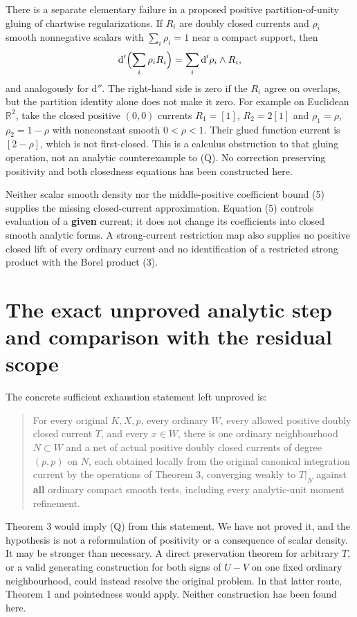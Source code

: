 \documentclass[
  11pt,
]{article}
\begin{document}
There is a separate elementary failure in a proposed positive
partition-of-unity gluing of chartwise regularizations. If \(R_i\) are
doubly closed currents and \(\rho_i\) smooth nonnegative scalars with
\(\sum_i\rho_i=1\) near a compact support, then
\[\mathrm d'\Bigl(\sum_i\rho_iR_i\Bigr)
    =\sum_i\mathrm d'\rho_i\wedge R_i,\] and analogously for
\(\mathrm d''\). The right-hand side is zero if the \(R_i\) agree on
overlaps, but the partition identity alone does not make it zero. For
example on Euclidean \(\mathbb R^2\), take the closed positive \((0,0)\)
currents \(R_1=[1]\), \(R_2=2[1]\) and \(\rho_1=\rho\),
\(\rho_2=1-\rho\) with nonconstant smooth \(0<\rho<1\). Their glued
function current is \([2-\rho]\), which is not first-closed. This is a
calculus obstruction to that gluing operation, not an analytic
counterexample to (Q). No correction preserving positivity and both
closedness equations has been constructed here.

Neither scalar smooth density nor the middle-positive coefficient bound
(5) supplies the missing closed-current approximation. Equation (5)
controls evaluation of a \textbf{given} current; it does not change its
coefficients into closed smooth analytic forms. A strong-current
restriction map also supplies no positive closed lift of every ordinary
current and no identification of a restricted strong product with the
Borel product (3).

\section{The exact unproved analytic step and comparison with the
residual
scope}\label{the-exact-unproved-analytic-step-and-comparison-with-the-residual-scope}

The concrete sufficient exhaustion statement left unproved is:

\begin{quote}
For every original \(K,X,p\), every ordinary \(W\), every allowed
positive doubly closed current \(T\), and every \(x\in W\), there is one
ordinary neighbourhood \(N\subset W\) and a net of actual positive
doubly closed currents of degree \((p,p)\) on \(N\), each obtained
locally from the original canonical integration current by the
operations of Theorem 3, converging weakly to \(T|_N\) against
\textbf{all} ordinary compact smooth tests, including every
analytic-unit moment refinement.
\end{quote}

Theorem 3 would imply (Q) from this statement. We have not proved it,
and the hypothesis is not a reformulation of positivity or a consequence
of scalar density. It may be stronger than necessary. A direct
preservation theorem for arbitrary \(T\), or a valid generating
construction for both signs of \(U-V\) on one fixed ordinary
neighbourhood, could instead resolve the original problem. In that
latter route, Theorem 1 and pointedness would apply. Neither
construction has been found here.
\end{document}
